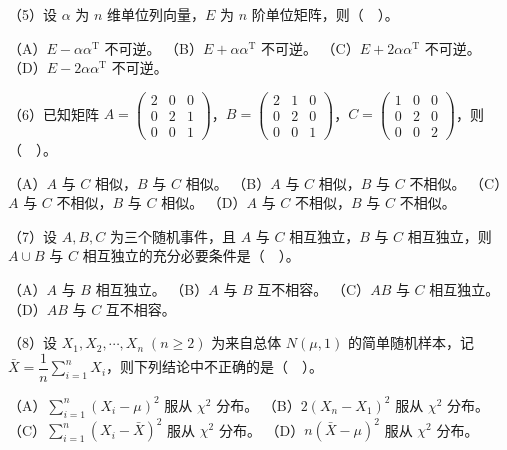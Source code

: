 \documentclass[UTF8,12pt]{ctexart}
\begin{document}
（5）设 \(\displaystyle \alpha\) 为 \(\displaystyle n\) 维单位列向量，\(\displaystyle E\) 为 \(\displaystyle n\) 阶单位矩阵，则（　）。


（A）\(\displaystyle E-\alpha\alpha^{\mathrm T}\) 不可逆。 （B）\(\displaystyle E+\alpha\alpha^{\mathrm T}\) 不可逆。 （C）\(\displaystyle E+2\alpha\alpha^{\mathrm T}\) 不可逆。 （D）\(\displaystyle E-2\alpha\alpha^{\mathrm T}\) 不可逆。


（6）已知矩阵 \(\displaystyle A=\begin{pmatrix}2&0&0\\0&2&1\\0&0&1\end{pmatrix}\)，\(\displaystyle B=\begin{pmatrix}2&1&0\\0&2&0\\0&0&1\end{pmatrix}\)，\(\displaystyle C=\begin{pmatrix}1&0&0\\0&2&0\\0&0&2\end{pmatrix}\)，则（　）。


（A）\(\displaystyle A\) 与 \(\displaystyle C\) 相似，\(\displaystyle B\) 与 \(\displaystyle C\) 相似。 （B）\(\displaystyle A\) 与 \(\displaystyle C\) 相似，\(\displaystyle B\) 与 \(\displaystyle C\) 不相似。 （C）\(\displaystyle A\) 与 \(\displaystyle C\) 不相似，\(\displaystyle B\) 与 \(\displaystyle C\) 相似。 （D）\(\displaystyle A\) 与 \(\displaystyle C\) 不相似，\(\displaystyle B\) 与 \(\displaystyle C\) 不相似。


（7）设 \(\displaystyle A,\allowbreak B,\allowbreak C\) 为三个随机事件，且 \(\displaystyle A\) 与 \(\displaystyle C\) 相互独立，\(\displaystyle B\) 与 \(\displaystyle C\) 相互独立，则 \(\displaystyle A\cup B\) 与 \(\displaystyle C\) 相互独立的充分必要条件是（　）。


（A）\(\displaystyle A\) 与 \(\displaystyle B\) 相互独立。 （B）\(\displaystyle A\) 与 \(\displaystyle B\) 互不相容。 （C）\(\displaystyle AB\) 与 \(\displaystyle C\) 相互独立。 （D）\(\displaystyle AB\) 与 \(\displaystyle C\) 互不相容。


（8）设 \(\displaystyle X_1,\allowbreak X_2,\allowbreak \cdots,\allowbreak X_n\;(n\ge2)\) 为来自总体 \(\displaystyle N(\mu,\allowbreak 1)\) 的简单随机样本，记 \(\displaystyle \bar X=\dfrac{\displaystyle 1}{\displaystyle n}\displaystyle \sum_{i=1}^nX_i\)，则下列结论中不正确的是（　）。


（A）\(\displaystyle \sum_{i=1}^n(X_i-\mu)^2\) 服从 \(\displaystyle \chi^2\) 分布。 （B）\(\displaystyle 2(X_n-X_1)^2\) 服从 \(\displaystyle \chi^2\) 分布。 （C）\(\displaystyle \sum_{i=1}^n(X_i-\bar X)^2\) 服从 \(\displaystyle \chi^2\) 分布。 （D）\(\displaystyle n(\bar X-\mu)^2\) 服从 \(\displaystyle \chi^2\) 分布。
\end{document}
